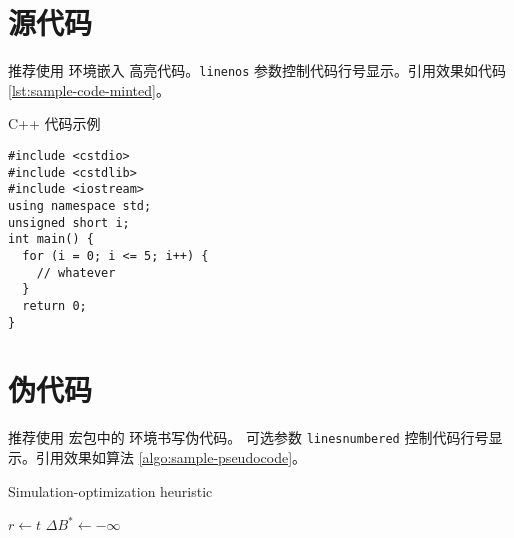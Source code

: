 \section{源代码}

推荐使用  环境嵌入 高亮代码。\verb|linenos| 参数控制代码行号显示。引用效果如代码 \ref{lst:sample-code-minted}。

\begin{listing}[!ht]
\caption{C++ 代码示例}
\label{lst:sample-code-minted}
\begin{verbatim}
#include <cstdio>
#include <cstdlib>
#include <iostream>
using namespace std;
unsigned short i;
int main() {
  for (i = 0; i <= 5; i++) {
    // whatever
  }
  return 0;
}
\end{verbatim}
\end{listing}

\section{伪代码}


推荐使用  宏包中的  环境书写伪代码。 可选参数 \verb|linesnumbered| 控制代码行号显示。引用效果如算法 \ref{algo:sample-pseudocode}。

\begin{algorithm}
  \caption{Simulation-optimization heuristic}
  \label{algo:sample-pseudocode}
  $r\leftarrow t$\;
  $\Delta B^{\ast}\leftarrow -\infty$\;
\end{algorithm}
